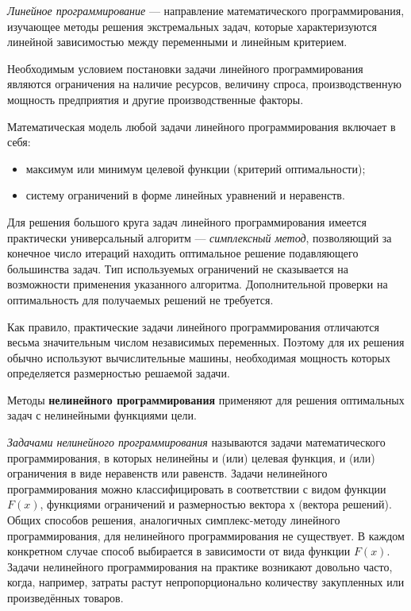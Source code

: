 \textsl{Линейное программирование} --- направление математического программирования, изучающее методы решения экстремальных задач, которые характеризуются линейной зависимостью между переменными и линейным критерием.

Необходимым условием постановки задачи линейного программирования являются ограничения на наличие ресурсов, величину спроса, производственную мощность предприятия и другие производственные факторы.

Математическая модель любой задачи линейного программирования включает в себя:

\begin{itemize}

\item максимум или минимум целевой функции (критерий оптимальности);

\item систему ограничений в форме линейных уравнений и неравенств.

\end{itemize}

Для решения большого круга задач линейного программирования имеется
практически универсальный алгоритм --- \textsl{симплексный метод},
позволяющий за конечное число итераций находить оптимальное решение
подавляющего большинства задач. Тип используемых ограничений не
сказывается на возможности применения указанного
алгоритма. Дополнительной проверки на оптимальность для получаемых
решений не требуется.

Как правило, практические задачи линейного программирования отличаются весьма значительным числом независимых переменных. Поэтому для их решения обычно используют вычислительные машины, необходимая мощность которых определяется размерностью решаемой задачи.

Методы \textbf{нелинейного программирования} применяют для решения оптимальных задач с нелинейными функциями цели.

\textsl{Задачами нелинейного программирования} называются
задачи математического программирования, в которых нелинейны и (или)
целевая функция, и (или) ограничения в виде неравенств или равенств.
Задачи нелинейного программирования можно классифицировать в
соответствии с видом функции $ F(x) $, функциями ограничений и
размерностью вектора $ х $ (вектора решений). Общих способов решения,
аналогичных симплекс-методу линейного программирования, для
нелинейного программирования не существует. В каждом конкретном
случае способ выбирается в зависимости от вида функции $ F(x) $. Задачи
нелинейного программирования на практике возникают довольно часто,
когда, например, затраты растут непропорционально количеству
закупленных или произведённых товаров.

